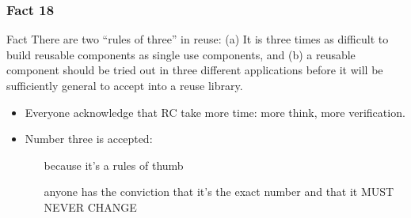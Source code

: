 \documentclass{beamer}
\begin{document}
\begin{frame}
    \frametitle{Fact 18}
    \begin{block}{Fact}
    There are two \enquote{rules of three} in reuse: (a) It is three times as
    difficult to build reusable components as single use components, and (b) a
    reusable component should be tried out in three different applications
    before it will be sufficiently general to accept into a reuse library.
    \end{block}


    \begin{itemize}

        \item Everyone acknowledge that RC take more time: more think,
            more verification.

        \item Number three is accepted:
            \begin{itemize}
                \item[\alert{because}] it's a rules of thumb 
            \item[\alert{anyone}] has the conviction that it's the exact number and
            that it MUST NEVER CHANGE
            \end{itemize}
    \end{itemize}
\end{frame}
\end{document}
